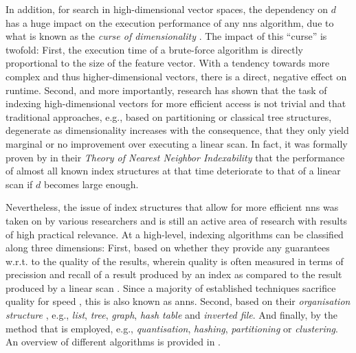 In addition, for search in high-dimensional vector spaces, the dependency on $d$ has a huge impact on the execution performance of any \acrshort{nns} algorithm, due to what is known as the \emph{curse of dimensionality} \cite{Indyk1998:Approximate,Zezula:2006Similarity}. The impact of this ``curse'' is twofold: First, the execution time of a brute-force algorithm is directly proportional to the size of the feature vector. With a tendency towards more complex and thus higher-dimensional vectors, there is a direct, negative effect on runtime. Second, and more importantly, research has shown that the task of indexing high-dimensional vectors for more efficient access is not trivial and that traditional approaches, e.g., based on partitioning or classical tree structures, degenerate as dimensionality increases \cite{Indyk1998:Approximate,Weber:1998Va} with the consequence, that they only yield marginal or no improvement over executing a linear scan. In fact, it was formally proven by \cite{Shaft:2006Theory} in their \emph{Theory of Nearest Neighbor Indexability} that the performance of almost all known index structures at that time deteriorate to that of a linear scan if $d$ becomes large enough.

Nevertheless, the issue of index structures that allow for more efficient \acrshort{nns} was taken on by various researchers and is still an active area of research with results of high practical relevance. At a high-level, indexing algorithms can be classified along three dimensions: First, based on whether they provide any guarantees w.r.t. to the quality of the results, wherein quality is often measured in terms of precission and recall of a result produced by an index as compared to the result produced by a linear scan \cite{Echihabi:2021High}. Since a majority of established techniques sacrifice quality for speed \cite{Siguroardottir:2005Quality}, this is also known as \acrfull{anns}. Second, based on their \emph{organisation structure} \cite{Shaft:2006Theory}, e.g., \emph{list}, \emph{tree}, \emph{graph}, \emph{hash table} and \emph{inverted file}. And finally, by the method that is employed, e.g., \emph{quantisation}, \emph{hashing}, \emph{partitioning} or \emph{clustering}. An overview of different algorithms is provided in .


